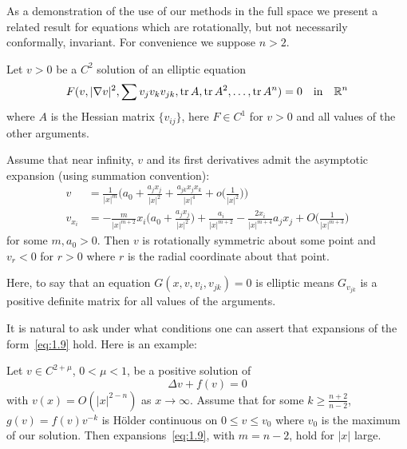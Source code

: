 As a demonstration of the use of our methods in the full space we present a related result for 
equations which are rotationally, but not necessarily conformally, invariant.
For convenience we suppose $n>2$.

\begin{theorem}\label{thm:4}
  Let $v>0$ be a $C^2$ solution of an elliptic equation
  \begin{equation}\label{eq:1.8}
    F(v, |\nabla v|^2, \sum v_jv_kv_{jk}, \operatorname{tr} A, \operatorname{tr} A^2, \ldots, \operatorname{tr} A^n) = 0
    \quad\text{in}\quad \mathbb{R}^n
  \end{equation}
  where $A$ is the Hessian matrix $\{v_{ij}\}$, here $F\in C^1$ for $v>0$
  and all values of the other arguments.

  Assume that near infinity, $v$ and its first derivatives admit the asymptotic
  expansion (using summation convention):
  \begin{equation}\label{eq:1.9}
    \begin{aligned}
      v & = \frac{1}{|x|^m}\biggl(a_0 + \frac{a_jx_j}{|x|^2} + \frac{a_{jk}x_jx_k}{|x|^4}
            + o\biggl(\frac{1}{|x|^2}\biggr)\biggr) \\
      v_{x_i} & = -\frac{m}{|x|^{m+2}} x_i\biggl(a_0 + \frac{a_jx_j}{|x|^2}\biggr)
            + \frac{a_i}{|x|^{m+2}} - \frac{2x_i}{|x|^{m+4}}a_jx_j
            + O\biggl(\frac{1}{|x|^{m+3}}\biggr)
    \end{aligned}
  \end{equation}
  for some $m, a_0> 0$. Then $v$ is rotationally symmetric about some point and $v_r<0$ 
  for $r > 0$ where $r$ is the radial coordinate about that point.
\end{theorem}

Here, to say that an equation $G(x, v, v_i, v_{jk})= 0$ is elliptic means 
$G_{v_{jk}}$ is a positive definite matrix for all values of the arguments.

It is natural to ask under what conditions one can assert that expansions of the 
form~\eqref{eq:1.9} hold. Here is an example:
\begin{proposition}\label{prop:1}
  Let $v\in C^{2+\mu}$, $0<\mu<1$, be a positive solution of
  \begin{equation}\label{eq:1.8prime}
    \Delta v + f(v) = 0 \tag{$1.8'$}
  \end{equation}
  with $v(x) = O(|x|^{2-n})$ as $x\to\infty$. Assume that for some
  $k\geq\frac{n+2}{n-2}$, $g(v) = f(v)v^{-k}$ is H\"older continuous on $0\leq v\leq v_0$
  where $v_0$ is the maximum of our solution. Then expansions~\eqref{eq:1.9},
  with $m=n-2$, hold for $|x|$ large.
\end{proposition}


